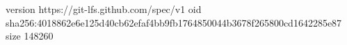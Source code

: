 version https://git-lfs.github.com/spec/v1
oid sha256:4018862e6e125d40cb62efaf4bb9fb1764850044b3678f265800cd1642285e87
size 148260
